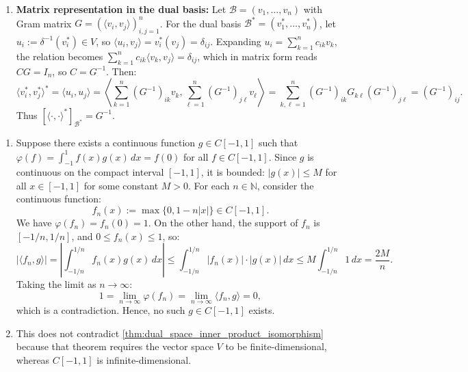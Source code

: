 \begin{exercisesolution}
\begin{enumerate}[label=\textbf{(\alph*)}]
    \item \textbf{Matrix representation in the dual basis:}
    Let $\mathcal{B} = (v_1, \dots, v_n)$ with Gram matrix $G = (\langle v_i, v_j \rangle)_{i,j=1}^n$.
    For the dual basis $\mathcal{B}^* = (v_1^*, \dots, v_n^*)$, let $u_i := \delta^{-1}(v_i^*) \in V$, so $\langle u_i, v_j \rangle = v_i^*(v_j) = \delta_{ij}$.
    Expanding $u_i = \sum_{k=1}^n c_{ik} v_k$, the relation becomes $\sum_{k=1}^n c_{ik} \langle v_k, v_j \rangle = \delta_{ij}$, which in matrix form reads $C G = I_n$, so $C = G^{-1}$.
    Then:
    \[
    \langle v_i^*, v_j^* \rangle^* = \langle u_i, u_j \rangle = \left\langle \sum_{k=1}^n (G^{-1})_{ik} v_k, \sum_{\ell=1}^n (G^{-1})_{j\ell} v_\ell \right\rangle = \sum_{k,\ell=1}^n (G^{-1})_{ik} G_{k\ell} (G^{-1})_{j\ell} = (G^{-1})_{ij}.
    \]
    Thus $[\langle \cdot, \cdot \rangle^*]_{\mathcal{B}^*} = G^{-1}$. \qedhere
\end{enumerate}
\end{exercisesolution}

\begin{exercisesolution}
\label{sol:riesz_failure_infinite_dimensions}
\begin{enumerate}[label=\textbf{(\alph*)}]
    \item Suppose there exists a continuous function $g \in C[-1, 1]$ such that $\varphi(f) = \int_{-1}^1 f(x) g(x) \, dx = f(0)$ for all $f \in C[-1, 1]$.
    Since $g$ is continuous on the compact interval $[-1, 1]$, it is bounded: $|g(x)| \le M$ for all $x \in [-1, 1]$ for some constant $M > 0$.
    For each $n \in \mathbb{N}$, consider the continuous function:
    \[
    f_n(x) := \max\{0, 1 - n|x|\} \in C[-1, 1].
    \]
    We have $\varphi(f_n) = f_n(0) = 1$.
    On the other hand, the support of $f_n$ is $[-1/n, 1/n]$, and $0 \le f_n(x) \le 1$, so:
    \[
    |\langle f_n, g \rangle| = \left| \int_{-1/n}^{1/n} f_n(x) g(x) \, dx \right| \le \int_{-1/n}^{1/n} |f_n(x)| \cdot |g(x)| \, dx \le M \int_{-1/n}^{1/n} 1 \, dx = \frac{2M}{n}.
    \]
    Taking the limit as $n \to \infty$:
    \[
    1 = \lim_{n \to \infty} \varphi(f_n) = \lim_{n \to \infty} \langle f_n, g \rangle = 0,
    \]
    which is a contradiction. Hence, no such $g \in C[-1, 1]$ exists.

    \item This does not contradict \cref{thm:dual_space_inner_product_isomorphism} because that theorem requires the vector space $V$ to be finite-dimensional, whereas $C[-1, 1]$ is infinite-dimensional. \qedhere
\end{enumerate}
\end{exercisesolution}

